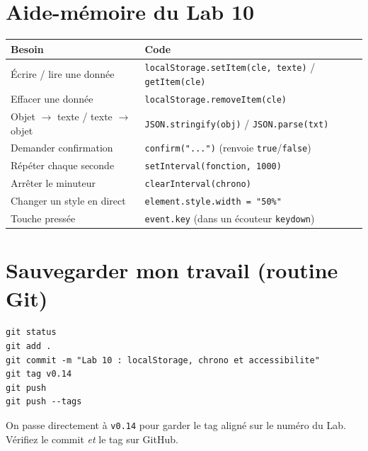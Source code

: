 \documentclass[11pt,a4paper]{article}
\newcommand{\code}[1]{\texttt{#1}}
\begin{document}
\section{Aide-mémoire du Lab 10}

\begin{center}
\begin{tabular}{p{5.6cm} p{7.4cm}}
\toprule
\textbf{Besoin} & \textbf{Code} \\
\midrule
Écrire / lire une donnée & \code{localStorage.setItem(cle, texte)} / \code{getItem(cle)} \\
Effacer une donnée & \code{localStorage.removeItem(cle)} \\
Objet $\rightarrow$ texte / texte $\rightarrow$ objet & \code{JSON.stringify(obj)} / \code{JSON.parse(txt)} \\
Demander confirmation & \code{confirm("...")} \quad (renvoie \code{true}/\code{false}) \\
Répéter chaque seconde & \code{setInterval(fonction, 1000)} \\
Arrêter le minuteur & \code{clearInterval(chrono)} \\
Changer un style en direct & \code{element.style.width = "50\%"} \\
Touche pressée & \code{event.key} \quad (dans un écouteur \code{keydown}) \\
\bottomrule
\end{tabular}
\end{center}

\section{Sauvegarder mon travail (routine Git)}

\begin{retenirbox}
\begin{lstlisting}[style=html]
git status
git add .
git commit -m "Lab 10 : localStorage, chrono et accessibilite"
git tag v0.14
git push
git push --tags
\end{lstlisting}
On passe directement à \code{v0.14} pour garder le tag aligné sur le numéro du Lab. Vérifiez le commit \emph{et} le tag sur GitHub.
\end{retenirbox}
\end{document}
